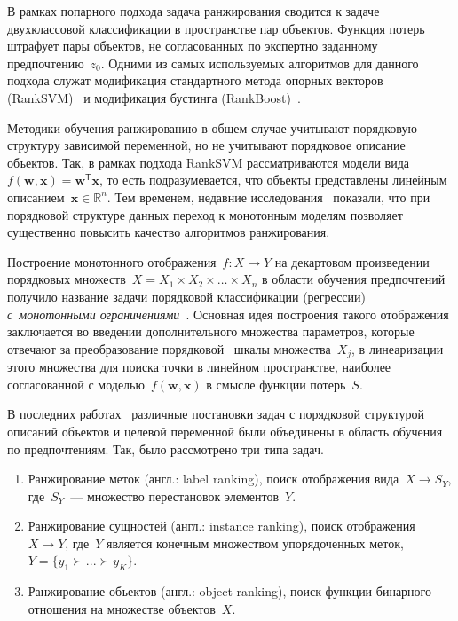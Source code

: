 \documentclass{elsarticle}
\newcommand{\bx}{\mathbf{x}}
\newcommand{\bw}{\mathbf{w}}
\newcommand{\T}{^{\mathsf{T}}}
\begin{document}
В рамках попарного подхода задача ранжирования сводится к задаче двухклассовой классификации в пространстве пар объектов. Функция потерь штрафует пары объектов, не согласованных по экспертно заданному предпочтению~$z_0$. Одними из самых используемых алгоритмов для данного подхода служат модификация стандартного метода опорных векторов (RankSVM)~\cite{herbrich1999large, cao2006adapting} и модификация бустинга (RankBoost)~\cite{freund2003efficient}.

Методики обучения ранжированию в общем случае учитывают порядковую структуру зависимой переменной, но не учитывают порядковое описание объектов. Так, в рамках подхода RankSVM рассматриваются модели вида~$f(\bw,\bx)=\bw\T\bx$, то есть подразумевается, что объекты представлены линейным описанием~$\bx\in\mathbb{R}^n$. Тем временем, недавние исследования~\cite{duivesteijn2008knn, stenina2015ordinal} показали, что при порядковой структуре данных переход к монотонным моделям позволяет существенно повысить качество алгоритмов ранжирования.

Построение монотонного отображения~$f:X\rightarrow Y$ на декартовом произведении порядковых множеств~$X=X_1\times X_2\times \dots \times X_n$ в области обучения предпочтений получило название задачи порядковой классификации (регрессии) \emph{с~монотонными ограничениями}~\cite{Corrente2013, Kotlowski2013, dembczynski2008ordinal, Cheng2010}. Основная идея построения такого отображения заключается во введении дополнительного множества параметров, которые отвечают за преобразование порядковой~\cite{Moshkovich2002,Khurshid1993} шкалы множества~$X_j$, в линеаризации этого множества для поиска точки в линейном пространстве, наиболее согласованной с моделью~$f(\bw,\bx)$ в смысле функции потерь~$S$.


В последних работах~\cite{Fuernkranz2011} различные постановки задач с порядковой структурой описаний объектов и целевой переменной были объединены в область обучения по предпочтениям. Так, было рассмотрено три типа задач.
\begin{enumerate}
\item Ранжирование меток (англ.: label ranking), поиск отображения вида~$X\rightarrow S_Y$, где~$S_Y$~--- множество перестановок элементов~$Y$.
\item Ранжирование сущностей (англ.: instance ranking), поиск отображения~$X\rightarrow Y$, где~$Y$ является конечным множеством упорядоченных меток, $Y=\{y_1\succ ...\succ y_K\}$.
\item Ранжирование объектов (англ.: object ranking), поиск функции бинарного отношения на множестве объектов~$X$.
\end{enumerate}
\end{document}
